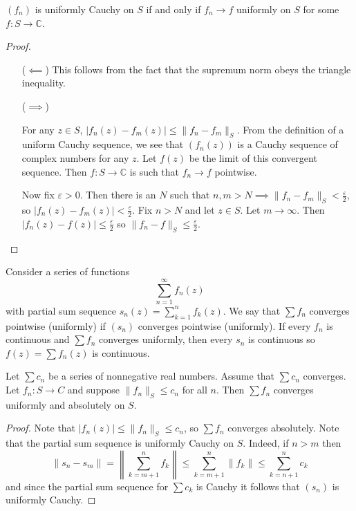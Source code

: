 \begin{theorem}
  $(f_n)$ is uniformly Cauchy on $S$ if and only if
  $f_n \to f$ uniformly on $S$ for some $f : S \to \mathbb{C}$.
\end{theorem}

\begin{proof}
  \begin{itemize}
    \item[($\impliedby$)]{
      This follows from the fact that the supremum norm
      obeys the triangle inequality.
    }
    \item[($\implies$)]{
      For any $z \in S$,
      $|f_n(z) - f_m(z)| \leq \| f_n - f_m \|_S$.
      From the definition of a uniform Cauchy sequence, we see that
      $(f_n(z))$ is a Cauchy sequence of complex numbers for any $z$.
      Let $f(z)$ be the limit of this convergent sequence. Then
      $f : S \to \mathbb{C}$ is such that $f_n \to f$ pointwise.

      Now fix $\varepsilon > 0$. Then there is an $N$ such that
      $n, m > N \implies \| f_n - f_m \|_S < \frac{\varepsilon}{2}$,
      so $|f_n(z) - f_m(z)| < \frac{\varepsilon}{2}$.
      Fix $n > N$ and let $z \in S$. Let $m \to \infty$. Then
      $|f_n(z) - f(z)| \leq \frac{\varepsilon}{2}$ so
      $\| f_n - f \|_S \leq \frac{\varepsilon}{2}$.
    }
  \end{itemize}
\end{proof}

Consider a series of functions
$$
\sum_{n=1}^\infty f_n(z)
$$
with partial sum sequence $s_n(z) = \sum_{k=1}^n f_k(z)$.
We say that $\sum f_n$ converges pointwise (uniformly) if $(s_n)$
converges pointwise (uniformly). If every $f_n$ is continuous and
$\sum f_n$ converges uniformly, then every $s_n$ is continuous
so $f(z) = \sum f_n(z)$ is continuous.

\begin{theorem}
  Let $\sum c_n$ be a series of nonnegative real numbers.
  Assume that $\sum c_n$ converges. Let $f_n : S \to C$
  and suppose $\| f_n \|_S \leq c_n$ for all $n$. Then
  $\sum f_n$ converges uniformly and absolutely on $S$.
\end{theorem}

\begin{proof}
  Note that $|f_n(z)| \leq \|f_n\|_S \leq c_n$, so
  $\sum f_n$ converges absolutely. Note that the
  partial sum sequence is uniformly Cauchy on $S$.
  Indeed, if $n > m$ then
  $$
       \| s_n - s_m \|
  =    \left\| \sum_{k=m+1}^n f_k \right\|
  \leq \sum_{k=m+1}^n \| f_k \| \leq \sum_{k=n+1}^n c_k
  $$
  and since the partial sum sequence for $\sum c_k$ is Cauchy
  it follows that $(s_n)$ is uniformly Cauchy.
\end{proof}

